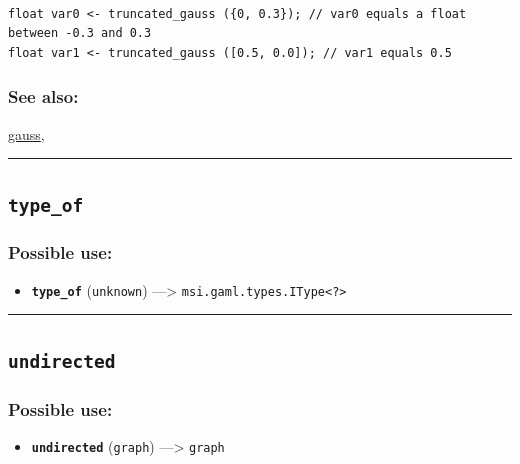 \documentclass[]{book}
\providecommand{\tightlist}{%
  \setlength{\itemsep}{0pt}\setlength{\parskip}{0pt}}
\theoremstyle{definition}
\theoremstyle{definition}
\theoremstyle{definition}
\theoremstyle{remark}
\begin{document}
\begin{verbatim}
 
float var0 <- truncated_gauss ({0, 0.3}); // var0 equals a float between -0.3 and 0.3 
float var1 <- truncated_gauss ([0.5, 0.0]); // var1 equals 0.5
\end{verbatim}

\subsubsection{See also:}\label{see-also-212}

\href{operators-d-to-h.html\#gauss}{gauss},

\begin{center}\rule{0.5\linewidth}{\linethickness}\end{center}

\subsection{\texorpdfstring{\texttt{type\_of}}{type\_of}}\label{type_of}

\subsubsection{Possible use:}\label{possible-use-536}

\begin{itemize}
\tightlist
\item
  \textbf{\texttt{type\_of}} (\texttt{unknown}) ---\textgreater{}
  \texttt{msi.gaml.types.IType\textless{}?\textgreater{}}
\end{itemize}

\begin{center}\rule{0.5\linewidth}{\linethickness}\end{center}

\subsection{\texorpdfstring{\texttt{undirected}}{undirected}}\label{undirected}

\subsubsection{Possible use:}\label{possible-use-537}

\begin{itemize}
\tightlist
\item
  \textbf{\texttt{undirected}} (\texttt{graph}) ---\textgreater{}
  \texttt{graph}
\end{itemize}
\end{document}
